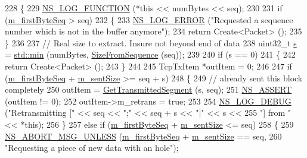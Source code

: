 \begin{DoxyCode}
228 \{
229   \hyperlink{log-macros-disabled_8h_a90b90d5bad1f39cb1b64923ea94c0761}{NS\_LOG\_FUNCTION} (*\textcolor{keyword}{this} << numBytes << seq);
230 
231   \textcolor{keywordflow}{if} (\hyperlink{classns3_1_1TcpTxBuffer_a46b67e5cb3396b43a41dd3fd5b135346}{m\_firstByteSeq} > seq)
232     \{
233       \hyperlink{group__logging_ga0261a8db1d4ac5f79417d117634fd455}{NS\_LOG\_ERROR} (\textcolor{stringliteral}{"Requested a sequence number which is not in the buffer anymore"});
234       \textcolor{keywordflow}{return} Create<Packet> ();
235     \}
236 
237   \textcolor{comment}{// Real size to extract. Insure not beyond end of data}
238   uint32\_t \hyperlink{generate__test__data__lte__sinr_8m_ad83eeb3a142285d1243a08c6b7026df8}{s} = \hyperlink{80211b_8c_ac6afabdc09a49a433ee19d8a9486056d}{std::min} (numBytes, \hyperlink{classns3_1_1TcpTxBuffer_a6e44c34fdb2c14dcc11dbbe86d8b328a}{SizeFromSequence} (seq));
239 
240   \textcolor{keywordflow}{if} (s == 0)
241     \{
242       \textcolor{keywordflow}{return} Create<Packet> ();
243     \}
244 
245   TcpTxItem *outItem = 0;
246 
247   \textcolor{keywordflow}{if} (\hyperlink{classns3_1_1TcpTxBuffer_a46b67e5cb3396b43a41dd3fd5b135346}{m\_firstByteSeq} + \hyperlink{classns3_1_1TcpTxBuffer_ae45302ec0a3b3d757b0f3ad85e88e363}{m\_sentSize} >= seq + s)
248     \{
249       \textcolor{comment}{// already sent this block completely}
250       outItem = \hyperlink{classns3_1_1TcpTxBuffer_a4de9715c65893a5cb8a869e72ed7bb10}{GetTransmittedSegment} (s, seq);
251       \hyperlink{assert_8h_a6dccdb0de9b252f60088ce281c49d052}{NS\_ASSERT} (outItem != 0);
252       outItem->m\_retrans = \textcolor{keyword}{true};
253 
254       \hyperlink{group__logging_ga413f1886406d49f59a6a0a89b77b4d0a}{NS\_LOG\_DEBUG} (\textcolor{stringliteral}{"Retransmitting ["} << seq << \textcolor{stringliteral}{";"} << seq + s << \textcolor{stringliteral}{"|"} << s <<
255                     \textcolor{stringliteral}{"] from "} << *\textcolor{keyword}{this});
256     \}
257   \textcolor{keywordflow}{else} \textcolor{keywordflow}{if} (\hyperlink{classns3_1_1TcpTxBuffer_a46b67e5cb3396b43a41dd3fd5b135346}{m\_firstByteSeq} + \hyperlink{classns3_1_1TcpTxBuffer_ae45302ec0a3b3d757b0f3ad85e88e363}{m\_sentSize} <= seq)
258     \{
259       \hyperlink{group__fatal_ga0bd3f62c55e7347ff814572f3aaa3864}{NS\_ABORT\_MSG\_UNLESS} (\hyperlink{classns3_1_1TcpTxBuffer_a46b67e5cb3396b43a41dd3fd5b135346}{m\_firstByteSeq} + 
      \hyperlink{classns3_1_1TcpTxBuffer_ae45302ec0a3b3d757b0f3ad85e88e363}{m\_sentSize} == seq,
260                            \textcolor{stringliteral}{"Requesting a piece of new data with an hole"});

\end{DoxyCode}
